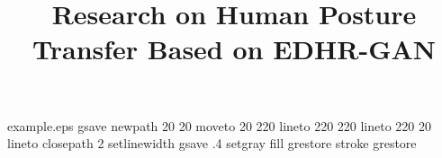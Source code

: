 %
%
%
%
%
\begin{filecontents*}{example.eps}
gsave
newpath
	20 20 moveto
	20 220 lineto
	220 220 lineto
	220 20 lineto
closepath
2 setlinewidth
gsave
	.4 setgray fill
grestore
stroke
grestore
\end{filecontents*}
%
\RequirePackage{fix-cm}
%
\documentclass[smallcondensed]{svjour3}     %
%
\smartqed  %
%
\usepackage{algorithmic}
\usepackage{amsmath,amssymb,amsfonts}
\usepackage{enumerate}
\usepackage{wrapfig}
\usepackage{graphicx}
\usepackage{appendix}
\usepackage{graphicx}
\usepackage{amsmath}
\usepackage{caption}
\usepackage{subfigure}
\usepackage{makecell}
\usepackage{multirow}
\usepackage{booktabs}
\usepackage{threeparttable}
\usepackage{geometry}
\usepackage{float}
\usepackage{indentfirst}
\usepackage[colorlinks,
linkcolor=blue,
anchorcolor=black,
citecolor=blue]{hyperref}
\geometry{top=2.5cm,bottom=2.5cm}
%
%
%
%
%

	
\title{Research on Human Posture Transfer Based on EDHR-GAN%
}
	
